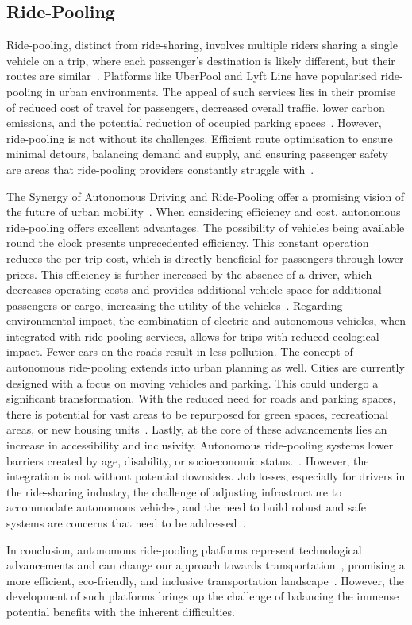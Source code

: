 \subsection{Ride-Pooling}
Ride-pooling, distinct from ride-sharing, involves multiple riders sharing a single vehicle on a trip, where each passenger's destination is likely different, but their routes are similar~\cite{Perivier.}. Platforms like UberPool and Lyft Line have popularised ride-pooling in urban environments. The appeal of such services lies in their promise of reduced cost of travel for passengers, decreased overall traffic, lower carbon emissions, and the potential reduction of occupied parking spaces~\cite{Shaheen.}.
However, ride-pooling is not without its challenges. Efficient route optimisation to ensure minimal detours, balancing demand and supply, and ensuring passenger safety are areas that ride-pooling providers constantly struggle with~\cite{Perivier.}.

The Synergy of Autonomous Driving and Ride-Pooling offer a promising vision of the future of urban mobility~\cite{Stamadianos.2023}.
When considering efficiency and cost, autonomous ride-pooling offers excellent advantages. The possibility of vehicles being available round the clock presents unprecedented efficiency. This constant operation reduces the per-trip cost, which is directly beneficial for passengers through lower prices. This efficiency is further increased by the absence of a driver, which decreases operating costs and provides additional vehicle space for additional passengers or cargo, increasing the utility of the vehicles~\cite{Hacohen.2022,Stamadianos.2023}.
Regarding environmental impact, the combination of electric and autonomous vehicles, when integrated with ride-pooling services, allows  for trips with reduced ecological impact. Fewer cars on the roads result in less pollution\cite{Hacohen.2022,Stamadianos.2023}. The concept of autonomous ride-pooling extends into urban planning as well.  Cities are currently designed with a focus on  moving vehicles and parking. This could undergo a significant transformation. With the reduced need for roads and parking spaces, there is potential for vast areas to be repurposed for green spaces, recreational areas, or new housing units~\cite{Stamadianos.2023}.
Lastly, at the core of these advancements lies an increase in accessibility and inclusivity.  Autonomous ride-pooling systems lower barriers created by age, disability, or socioeconomic status.~\cite{Hacohen.2022}.
However, the integration is not without potential downsides. Job losses, especially for drivers in the ride-sharing industry, the challenge of adjusting infrastructure to accommodate autonomous vehicles, and the need to build robust and safe systems are concerns that need to be addressed~\cite{Hacohen.2022}.

In conclusion, autonomous ride-pooling platforms represent technological advancements and can change our approach towards transportation~\cite{Shaheen.}, promising a more efficient, eco-friendly, and inclusive transportation landscape~\cite{Stamadianos.2023}. However, the development of such platforms brings up the challenge of balancing the immense potential benefits with the inherent difficulties. 